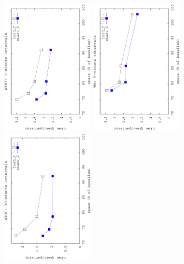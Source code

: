 	\begin{figure}[ht]
		\begin{center}
			\begin{center}
				{\includegraphics[angle=-90,width=0.4\textwidth]{figures_synt/madrid_t5mht.eps}}
				{\includegraphics[angle=-90,width=0.4\textwidth]{figures_synt/madrid_t5mwm.eps}}
				{\includegraphics[angle=-90,width=0.4\textwidth]{figures_synt/madrid_t30mht.eps}}

\end{center}
\end{center}
\end{figure}
